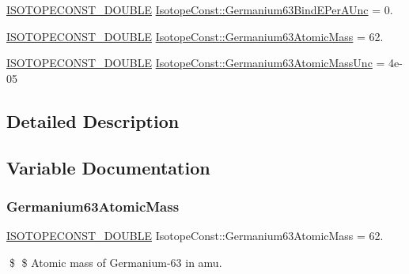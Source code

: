 \begin{DoxyCompactItemize}
\mbox{\hyperlink{group___isotope_const-_macros_ga8f45a7272ce02c0b4c65c44636ed719a}{I\+S\+O\+T\+O\+P\+E\+C\+O\+N\+S\+T\+\_\+\+D\+O\+U\+B\+LE}} \mbox{\hyperlink{group___isotope_const-_germanium-_ge63_ga715bd19d372e29815ad39c69abc086ea}{Isotope\+Const\+::\+Germanium63\+Bind\+E\+Per\+A\+Unc}} = 0.
\item 
\mbox{\hyperlink{group___isotope_const-_macros_ga8f45a7272ce02c0b4c65c44636ed719a}{I\+S\+O\+T\+O\+P\+E\+C\+O\+N\+S\+T\+\_\+\+D\+O\+U\+B\+LE}} \mbox{\hyperlink{group___isotope_const-_germanium-_ge63_ga42f1ee634b7607709d99a22c76c8db9a}{Isotope\+Const\+::\+Germanium63\+Atomic\+Mass}} = 62.
\item 
\mbox{\hyperlink{group___isotope_const-_macros_ga8f45a7272ce02c0b4c65c44636ed719a}{I\+S\+O\+T\+O\+P\+E\+C\+O\+N\+S\+T\+\_\+\+D\+O\+U\+B\+LE}} \mbox{\hyperlink{group___isotope_const-_germanium-_ge63_gaf70d73a53c12726f33ece192e0ba554e}{Isotope\+Const\+::\+Germanium63\+Atomic\+Mass\+Unc}} = 4e-\/05
\end{DoxyCompactItemize}


\subsection{Detailed Description}


\subsection{Variable Documentation}
\mbox{\label{group___isotope_const-_germanium-_ge63_ga42f1ee634b7607709d99a22c76c8db9a}} 
\subsubsection{\texorpdfstring{Germanium63\+Atomic\+Mass}{Germanium63AtomicMass}}
{\footnotesize\ttfamily \mbox{\hyperlink{group___isotope_const-_macros_ga8f45a7272ce02c0b4c65c44636ed719a}{I\+S\+O\+T\+O\+P\+E\+C\+O\+N\+S\+T\+\_\+\+D\+O\+U\+B\+LE}} Isotope\+Const\+::\+Germanium63\+Atomic\+Mass = 62.}

\$ \$ Atomic mass of Germanium-\/63 in amu. \mbox{\label{group___isotope_const-_germanium-_ge63_gaf70d73a53c12726f33ece192e0ba554e}} 
